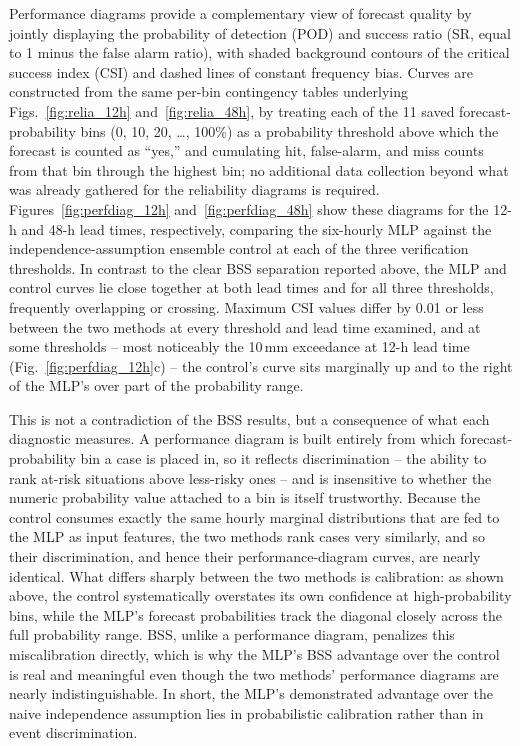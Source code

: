 \documentclass[11pt]{article}
\begin{document}
Performance diagrams \citep{roebber2009} provide a complementary view of forecast
quality by jointly displaying the probability of detection (POD) and success ratio
(SR, equal to 1 minus the false alarm ratio), with shaded background contours of the
critical success index (CSI) and dashed lines of constant frequency bias.  Curves are
constructed from the same per-bin contingency tables underlying
Figs.~\ref{fig:relia_12h} and~\ref{fig:relia_48h}, by treating each of the 11 saved
forecast-probability bins (0, 10, 20, \ldots, 100\%) as a probability threshold above
which the forecast is counted as ``yes,'' and cumulating hit, false-alarm, and miss
counts from that bin through the highest bin; no additional data collection beyond
what was already gathered for the reliability diagrams is required.
Figures~\ref{fig:perfdiag_12h} and~\ref{fig:perfdiag_48h} show these diagrams for the
12-h and 48-h lead times, respectively, comparing the six-hourly MLP against the
independence-assumption ensemble control at each of the three verification
thresholds.  In contrast to the clear BSS separation reported above, the MLP and
control curves lie close together at both lead times and for all three thresholds,
frequently overlapping or crossing.  Maximum CSI values differ by 0.01 or less between
the two methods at every threshold and lead time examined, and at some
thresholds -- most noticeably the 10\,mm exceedance at 12-h lead time
(Fig.~\ref{fig:perfdiag_12h}c) -- the control's curve sits marginally up and to the
right of the MLP's over part of the probability range.

This is not a contradiction of the BSS results, but a consequence of what each
diagnostic measures.  A performance diagram is built entirely from which
forecast-probability bin a case is placed in, so it reflects discrimination -- the
ability to rank at-risk situations above less-risky ones -- and is insensitive to
whether the numeric probability value attached to a bin is itself trustworthy.
Because the control consumes exactly the same hourly marginal distributions that are
fed to the MLP as input features, the two methods rank cases very similarly, and so
their discrimination, and hence their performance-diagram curves, are nearly
identical.  What differs sharply between the two methods is calibration: as shown
above, the control systematically overstates its own confidence at high-probability
bins, while the MLP's forecast probabilities track the diagonal closely across the
full probability range.  BSS, unlike a performance diagram, penalizes this
miscalibration directly, which is why the MLP's BSS advantage over the control is
real and meaningful even though the two methods' performance diagrams are nearly
indistinguishable.  In short, the MLP's demonstrated advantage over the naive
independence assumption lies in probabilistic calibration rather than in event
discrimination.
\end{document}
